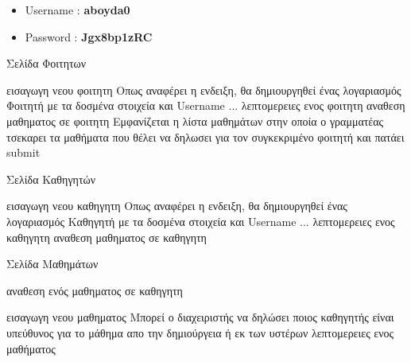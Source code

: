 \documentclass[12pt]{article}
\begin{document}
	\begin{itemize}
		\item Username : \textbf{aboyda0}
		\item Password : \textbf{Jgx8bp1zRC}
	\end{itemize}

	Σελίδα Φοιτητων
	
	εισαγωγη νεου φοιτητη
	Οπως αναφέρει η ενδειξη, θα δημιουργηθεί ένας λογαριασμός Φοιτητή με τα δοσμένα στοιχεία και Username ...
	λεπτομερειες ενος φοιτητη
	αναθεση μαθηματος σε φοιτητη
	Εμφανίζεται η λίστα μαθημάτων στην οποία ο γραμματέας τσεκαρει τα μαθήματα που θέλει να δηλωσει για τον συγκεκριμένο φοιτητή και πατάει submit
	
	Σελίδα Καθηγητών
	
	εισαγωγη νεου καθηγητη
	Οπως αναφέρει η ενδειξη, θα δημιουργηθεί ένας λογαριασμός Καθηγητή με τα δοσμένα στοιχεία και Username ...
	λεπτομερειες ενος καθηγητη
	αναθεση μαθηματος σε καθηγητη
	
	
	Σελίδα Μαθημάτων
	
	αναθεση ενός μαθηματος σε καθηγητη
	
	εισαγωγη νεου μαθηματος
	Μπορεί ο διαχειριστής να δηλώσει ποιος καθηγητής είναι υπεύθυνος για το μάθημα απο την δημιούργεια ή εκ των υστέρων
	λεπτομερειες ενος μαθήματος
	

		
		
	
\end{document}
